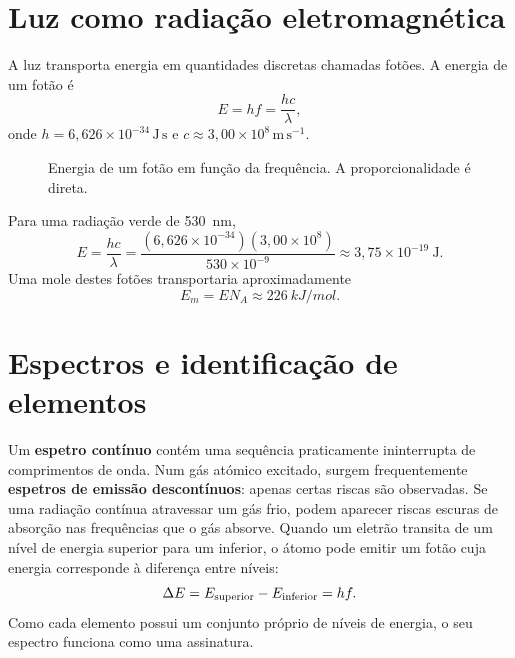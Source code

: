 \documentclass[11pt,a4paper,oneside]{book}
\begin{document}
\section{Luz como radiação eletromagnética}
A luz transporta energia em quantidades discretas chamadas fotões. A energia de um fotão é
\[
E=hf=\frac{hc}{\lambda},
\]
onde $h=6{,}626\times10^{-34}\,\mathrm{J\,s}$ e $c\approx3{,}00\times10^8\,\mathrm{m\,s^{-1}}$.

\begin{center}
\end{center}

\begin{figure}[H]
\centering
{}
\caption{Energia de um fotão em função da frequência. A proporcionalidade é direta.}
\end{figure}

\begin{exemplo}[title=Exemplo resolvido -- energia de um fotão]
Para uma radiação verde de \SI{530}{nm},
\[
E=\frac{hc}{\lambda}
 =\frac{(6{,}626\times10^{-34})(3{,}00\times10^8)}
 {530\times10^{-9}}
 \approx3{,}75\times10^{-19}\ \mathrm{J}.
\]
Uma mole destes fotões transportaria aproximadamente
\[
E_m=EN_A\approx\SI{226}{kJ/mol}.
\]
\end{exemplo}

\section{Espectros e identificação de elementos}
Um \textbf{espetro contínuo} contém uma sequência praticamente ininterrupta de comprimentos de onda. Num gás atómico excitado, surgem frequentemente \textbf{espetros de emissão descontínuos}: apenas certas riscas são observadas. Se uma radiação contínua atravessar um gás frio, podem aparecer riscas escuras de absorção nas frequências que o gás absorve.
Quando um eletrão transita de um nível de energia superior para um inferior, o átomo pode emitir um fotão cuja energia corresponde à diferença entre níveis:
\[
\Delta E=E_{\rm superior}-E_{\rm inferior}=hf.
\]
Como cada elemento possui um conjunto próprio de níveis de energia, o seu espectro funciona como uma assinatura.
\end{document}
